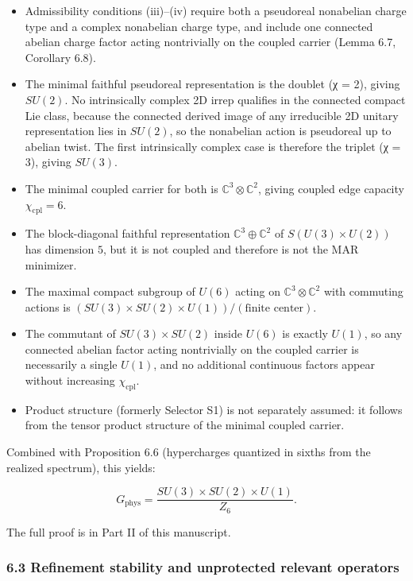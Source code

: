 \begin{itemize}
\tightlist
\item
  Admissibility conditions (iii)--(iv) require both a pseudoreal nonabelian charge type and a complex nonabelian charge type, and include one connected abelian charge factor acting nontrivially on the coupled carrier (Lemma 6.7, Corollary 6.8).
\item
  The minimal faithful pseudoreal representation is the doublet (χ = 2), giving \(SU(2)\). No intrinsically complex 2D irrep qualifies in the connected compact Lie class, because the connected derived image of any irreducible 2D unitary representation lies in \(SU(2)\), so the nonabelian action is pseudoreal up to abelian twist. The first intrinsically complex case is therefore the triplet (χ = 3), giving \(SU(3)\).
\item
  The minimal coupled carrier for both is \(\mathbb{C}^3 \otimes \mathbb{C}^2\), giving coupled edge capacity \(\chi_{\mathrm{cpl}} = 6\).
\item
  The block-diagonal faithful representation \(\mathbb{C}^3 \oplus \mathbb{C}^2\) of \(S(U(3)\times U(2))\) has dimension \(5\), but it is not coupled and therefore is not the MAR minimizer.
\item
  The maximal compact subgroup of \(U(6)\) acting on \(\mathbb{C}^3 \otimes \mathbb{C}^2\) with commuting actions is \((SU(3) \times SU(2) \times U(1))/(\text{finite center})\).
\item
  The commutant of \(SU(3) \times SU(2)\) inside \(U(6)\) is exactly \(U(1)\), so any connected abelian factor acting nontrivially on the coupled carrier is necessarily a single \(U(1)\), and no additional continuous factors appear without increasing \(\chi_{\mathrm{cpl}}\).
\item
  Product structure (formerly Selector S1) is not separately assumed: it follows from the tensor product structure of the minimal coupled carrier.
\end{itemize}

Combined with Proposition 6.6 (hypercharges quantized in sixths from the realized spectrum), this yields:

\[
G_{\mathrm{phys}} = \frac{SU(3) \times SU(2) \times U(1)}{Z_6}.
\]

The full proof is in Part II of this manuscript.

\subsubsection{6.3 Refinement stability and unprotected relevant operators}\label{63-refinement-stability-and-unprotected-relevant-operators}

